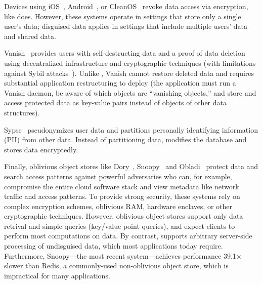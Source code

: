 %
Devices using iOS~\cite{applesecurity}, Android~\cite{applesecurity}, or
CleanOS~\cite{cleanos} revoke data access via encryption, like \sys does.
%
However, these systems operate in settings that store only a single user's data;
disguised data applies in settings that include multiple users' data and shared
data.
%

%
Vanish~\cite{vanish} provides users with self-destructing data and a proof of
data deletion using decentralized infrastructure and cryptographic techniques
(with limitations against Sybil attacks~\cite{defeat_vanish}). Unlike \sys,
Vanish cannot restore deleted data and requires substantial application
restructuring to deploy (\eg the application must run a Vanish daemon, be aware of which
objects are ``vanishing objects,'' and store and access protected data
as key-value pairs instead of objects of other data structures).
%

%
Sypse~\cite{sypse} pseudonymizes user data and partitions personally identifying
information (PII) from other data. Instead of partitioning data, \sys modifies
the database and stores \xxed data encryptedly.
%

%
Finally, oblivious object stores like Dory~\cite{dory}, Snoopy~\cite{snoopy} and
Obladi~\cite{obladi} protect data and search access patterns against powerful
adversaries who can, for example, compromise the entire cloud software stack and
view metadata like network traffic and access patterns. To provide strong
security, these systems rely on complex encryption schemes, oblivious RAM,
hardware enclaves, or other cryptographic techniques.
%
However, oblivious object stores support only data retrival and simple queries
(\eg key/value point queries), and expect clients to perform most 
computations on data.
%
By contrast, \sys supports arbitrary server-side processing of undisguised
data, which most applications today require. 
%
Furthermore, Snoopy---the most recent system---achieves performance 39.1$\times$ slower than Redis, a
commonly-used non-oblivious object store, which is impractical for many 
applications.


%
%
%

